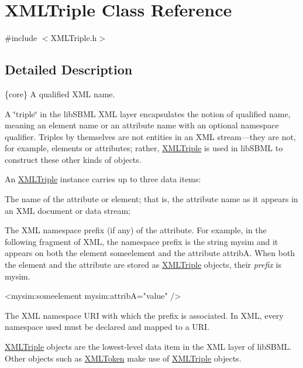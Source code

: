 \hypertarget{class_x_m_l_triple}{}\section{X\+M\+L\+Triple Class Reference}
\label{class_x_m_l_triple}


{\ttfamily \#include $<$X\+M\+L\+Triple.\+h$>$}



\subsection{Detailed Description}
\{core\} A qualified X\+ML name.



A \char`\"{}triple\char`\"{} in the lib\+S\+B\+ML X\+ML layer encapsulates the notion of qualified name, meaning an element name or an attribute name with an optional namespace qualifier. Triples by themselves are not entities in an X\+ML stream---they are not, for example, elements or attributes; rather, \hyperlink{class_x_m_l_triple}{X\+M\+L\+Triple} is used in lib\+S\+B\+ML to construct these other kinds of objects.

An \hyperlink{class_x_m_l_triple}{X\+M\+L\+Triple} instance carries up to three data items\+: 
\begin{DoxyEnumerate}
\item The name of the attribute or element; that is, the attribute name as it appears in an X\+ML document or data stream; 
\item The X\+ML namespace prefix (if any) of the attribute. For example, in the following fragment of X\+ML, the namespace prefix is the string {\ttfamily mysim} and it appears on both the element {\ttfamily someelement} and the attribute {\ttfamily attribA}. When both the element and the attribute are stored as \hyperlink{class_x_m_l_triple}{X\+M\+L\+Triple} objects, their {\itshape prefix} is {\ttfamily mysim}. \begin{DoxyVerb}<mysim:someelement mysim:attribA="value" />
\end{DoxyVerb}
 
\item The X\+ML namespace U\+RI with which the prefix is associated. In X\+ML, every namespace used must be declared and mapped to a U\+RI. 
\end{DoxyEnumerate}

\hyperlink{class_x_m_l_triple}{X\+M\+L\+Triple} objects are the lowest-\/level data item in the X\+ML layer of lib\+S\+B\+ML. Other objects such as \hyperlink{class_x_m_l_token}{X\+M\+L\+Token} make use of \hyperlink{class_x_m_l_triple}{X\+M\+L\+Triple} objects.

